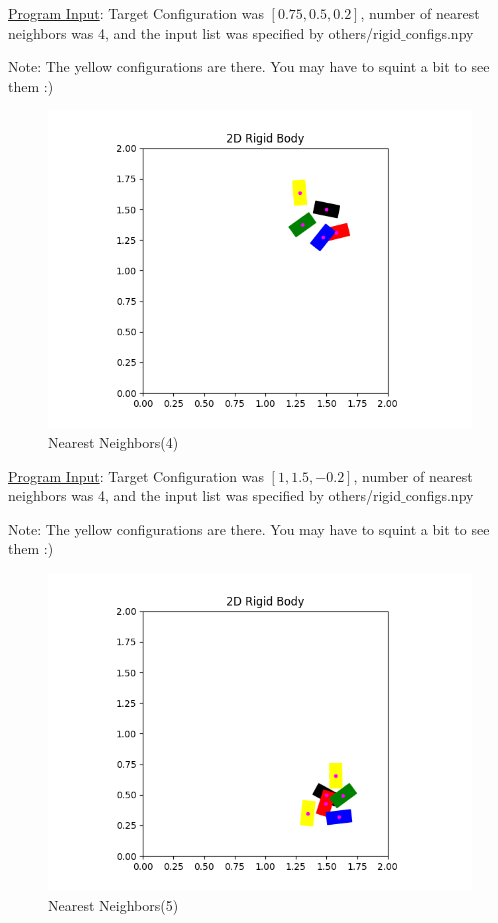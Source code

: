 \documentclass{article}
\begin{document}
\underline{Program Input}: Target Configuration was $[0.75, 0.5, 0.2]$, number of nearest neighbors was 4, and the input list was specified by others/rigid$\_$configs.npy \newline

Note: The yellow configurations are there. You may have to squint a bit to see them :) \newline  

\newpage 
\begin{figure}[h!]
	\includegraphics[width= 0.9 \linewidth]{P2_NearestNeighbor(4).png}
	\centering
	\caption{Nearest Neighbors(4)}
	\label{P2_NearestNeighbor(4).png}
\end{figure}

\underline{Program Input}: Target Configuration was $[1, 1.5, -0.2]$, number of nearest neighbors was 4, and the input list was specified by others/rigid$\_$configs.npy

Note: The yellow configurations are there. You may have to squint a bit to see them :) \newline

\newpage
\begin{figure}[h!]
	\includegraphics[width= 0.9 \linewidth]{P2_NearestNeighbor(5).png}
	\centering
	\caption{Nearest Neighbors(5)}
	\label{P2_NearestNeighbor(5).png}
\end{figure}
\end{document}
